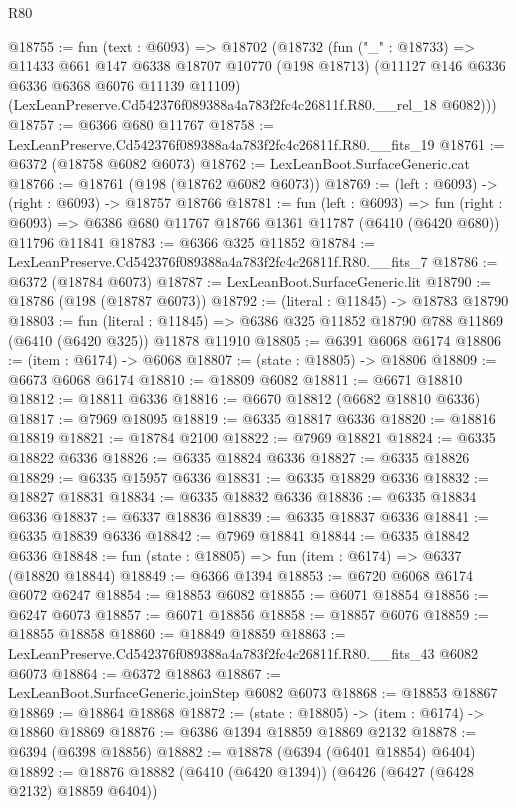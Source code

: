 \begin{lexlean}{R80}
\begin{coremodule}
@18755 := fun (text : @6093) =>
  @18702
    (@18732
      (fun ("_" : @18733) =>
      @11433
        @661
        @147
        @6338
        @18707
        @10770
        (@198 @18713)
        (@11127 @146 @6336 @6336 @6368 @6076 @11139 @11109)
        (LexLeanPreserve.Cd542376f089388a4a783f2fc4c26811f.R80.__rel_18 @6082)))
@18757 := @6366 @680 @11767
@18758 := LexLeanPreserve.Cd542376f089388a4a783f2fc4c26811f.R80.__fits_19
@18761 := @6372 (@18758 @6082 @6073)
@18762 := LexLeanBoot.SurfaceGeneric.cat
@18766 := @18761 (@198 (@18762 @6082 @6073))
@18769 := (left : @6093) -> (right : @6093) -> @18757 @18766
@18781 := fun (left : @6093) =>
  fun (right : @6093) => @6386 @680 @11767 @18766 @1361 @11787 (@6410 (@6420 @680)) @11796 @11841
@18783 := @6366 @325 @11852
@18784 := LexLeanPreserve.Cd542376f089388a4a783f2fc4c26811f.R80.__fits_7
@18786 := @6372 (@18784 @6073)
@18787 := LexLeanBoot.SurfaceGeneric.lit
@18790 := @18786 (@198 (@18787 @6073))
@18792 := (literal : @11845) -> @18783 @18790
@18803 := fun (literal : @11845) =>
  @6386 @325 @11852 @18790 @788 @11869 (@6410 (@6420 @325)) @11878 @11910
@18805 := @6391 @6068 @6174
@18806 := (item : @6174) -> @6068
@18807 := (state : @18805) -> @18806
@18809 := @6673 @6068 @6174
@18810 := @18809 @6082
@18811 := @6671 @18810
@18812 := @18811 @6336
@18816 := @6670 @18812 (@6682 @18810 @6336)
@18817 := @7969 @18095
@18819 := @6335 @18817 @6336
@18820 := @18816 @18819
@18821 := @18784 @2100
@18822 := @7969 @18821
@18824 := @6335 @18822 @6336
@18826 := @6335 @18824 @6336
@18827 := @6335 @18826
@18829 := @6335 @15957 @6336
@18831 := @6335 @18829 @6336
@18832 := @18827 @18831
@18834 := @6335 @18832 @6336
@18836 := @6335 @18834 @6336
@18837 := @6337 @18836
@18839 := @6335 @18837 @6336
@18841 := @6335 @18839 @6336
@18842 := @7969 @18841
@18844 := @6335 @18842 @6336
@18848 := fun (state : @18805) => fun (item : @6174) => @6337 (@18820 @18844)
@18849 := @6366 @1394
@18853 := @6720 @6068 @6174 @6072 @6247
@18854 := @18853 @6082
@18855 := @6071 @18854
@18856 := @6247 @6073
@18857 := @6071 @18856
@18858 := @18857 @6076
@18859 := @18855 @18858
@18860 := @18849 @18859
@18863 := LexLeanPreserve.Cd542376f089388a4a783f2fc4c26811f.R80.__fits_43 @6082 @6073
@18864 := @6372 @18863
@18867 := LexLeanBoot.SurfaceGeneric.joinStep @6082 @6073
@18868 := @18853 @18867
@18869 := @18864 @18868
@18872 := (state : @18805) -> (item : @6174) -> @18860 @18869
@18876 := @6386 @1394 @18859 @18869 @2132
@18878 := @6394 (@6398 @18856)
@18882 := @18878 (@6394 (@6401 @18854) @6404)
@18892 := @18876 @18882 (@6410 (@6420 @1394)) (@6426 (@6427 (@6428 @2132) @18859 @6404))

\end{coremodule}
\end{lexlean}
